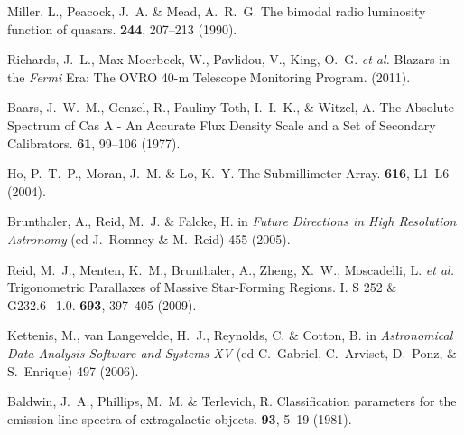 \clearpage
\begin{thebibliography}{10}

 {Miller}, L.,
{Peacock}, J.~A.  \& {Mead}, A.~R.~G. {The bimodal radio luminosity
function of quasars}.   {\bf
244}, 207--213 (1990).


 {Richards}, J.~L., 
{Max-Moerbeck}, W., {Pavlidou}, V., {King}, O.~G. {\it et al.}
{Blazars in the {\it Fermi} Era:  The OVRO 40-m Telescope
Monitoring Program}.  (2011).

 {Baars}, J.~W.~M., {Genzel}, R.,
{Pauliny-Toth}, I.~I.~K., \& {Witzel}, A. {The Absolute Spectrum of Cas A - 
An Accurate Flux Density Scale and a Set of Secondary Calibrators}.
 {\bf 61}, 99--106 (1977).

 {Ho}, P.~T.~P., {Moran},
J.~M.  \& {Lo}, K.~Y. {The Submillimeter Array}.    {\bf 616}, L1--L6 (2004).

 {Brunthaler}, A.,
{Reid}, M.~J.  \& {Falcke}, H. in {\it Future Directions in High
Resolution Astronomy} (ed {J.~Romney \& M.~Reid}) 455 (2005).

 {Reid}, M.~J., {Menten},
K.~M., {Brunthaler}, A., {Zheng}, X.~W., {Moscadelli}, L. {\it et al.}
{Trigonometric Parallaxes of Massive Star-Forming Regions. I.  S 252
\& G232.6+1.0}.   {\bf 693}, 397--405
(2009).

 {Kettenis}, M., {van
Langevelde}, H.~J., {Reynolds}, C.  \& {Cotton}, B. in {\it
Astronomical Data Analysis Software and Systems XV} (ed {C.~Gabriel,
C.~Arviset, D.~Ponz, \& S.~Enrique}) 497 (2006).

 {Baldwin},
J.~A., {Phillips}, M.~M.  \& {Terlevich}, R. {Classification
parameters for the emission-line spectra of extragalactic objects}.
 {\bf 93}, 5--19 (1981).


\end{thebibliography}
